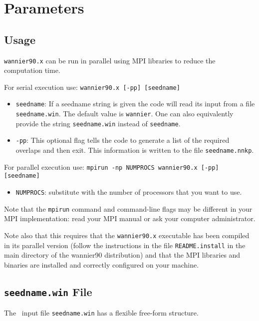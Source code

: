 \chapter{Parameters}\label{chap:parameters}

\section{Usage}
{\tt wannier90.x} can be run in parallel using MPI libraries to
reduce the computation time.

For serial execution use: {\tt wannier90.x [-pp] [seedname]}

\begin{itemize}
\item{ {\tt seedname}: If a seedname string is given the code will read its input
from a file {\tt seedname.win}. The default value is {\tt wannier}. One can also equivalently provide the string
  {\tt seedname.win} instead of  {\tt seedname}.}
\item { {\tt -pp}: This optional flag tells the code to generate
a list of the required overlaps and then exit. 
This information is written to the file {\tt seedname.nnkp}.}
\end{itemize}

For parallel execution use: {\tt mpirun -np NUMPROCS wannier90.x [-pp] [seedname]}

\begin{itemize} \item 
{\tt NUMPROCS}: substitute with the number of processors that you want
to use.
\end{itemize}

Note that the {\tt mpirun} command and command-line flags may be
different in your MPI implementation: read your MPI manual or ask your
computer administrator.

Note also that this requires that the {\tt wannier90.x} executable has been
compiled in its parallel version (follow the instructions in the file
{\tt README.install} in the main directory of the wannier90
distribution) and
that the MPI libraries and binaries are installed and correctly
configured on your machine.


\section{{\tt seedname.win} File\label{sec:seednamefile}}
The \wannier\ input file {\tt seedname.win} has a flexible free-form
structure. 

